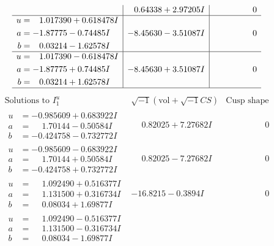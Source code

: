 \documentclass[1p]{elsarticle_modified}
\theoremstyle{definition}
\newcommand{\I}{\sqrt{-1}}
\begin{document}
$$\begin{array}{c|c|c}
 & \phantom{-}0.64338 + 2.97205 I & \phantom{-0.000000 } 0 \\ \hline\begin{aligned}
u &= \phantom{-}1.017390 + 0.618478 I \\
a &= -1.87775 - 0.74485 I \\
b &= \phantom{-}0.03214 - 1.62578 I\end{aligned}
 & -8.45630 - 3.51087 I & \phantom{-0.000000 } 0 \\ \hline\begin{aligned}
u &= \phantom{-}1.017390 - 0.618478 I \\
a &= -1.87775 + 0.74485 I \\
b &= \phantom{-}0.03214 + 1.62578 I\end{aligned}
 & -8.45630 + 3.51087 I & \phantom{-0.000000 } 0\\
 \hline 
 \end{array}$$\newpage$$\begin{array}{c|c|c}  
\text{Solutions to }I^u_{1}& \I (\text{vol} + \sqrt{-1}CS) & \text{Cusp shape}\\
 \hline 
\begin{aligned}
u &= -0.985609 + 0.683922 I \\
a &= \phantom{-}1.70144 - 0.50584 I \\
b &= -0.424758 - 0.732772 I\end{aligned}
 & \phantom{-}0.82025 + 7.27682 I & \phantom{-0.000000 } 0 \\ \hline\begin{aligned}
u &= -0.985609 - 0.683922 I \\
a &= \phantom{-}1.70144 + 0.50584 I \\
b &= -0.424758 + 0.732772 I\end{aligned}
 & \phantom{-}0.82025 - 7.27682 I & \phantom{-0.000000 } 0 \\ \hline\begin{aligned}
u &= \phantom{-}1.092490 + 0.516377 I \\
a &= \phantom{-}1.131500 + 0.316734 I \\
b &= \phantom{-}0.08034 + 1.69877 I\end{aligned}
 & -16.8215 - 0.3894 I & \phantom{-0.000000 } 0 \\ \hline\begin{aligned}
u &= \phantom{-}1.092490 - 0.516377 I \\
a &= \phantom{-}1.131500 - 0.316734 I \\
b &= \phantom{-}0.08034 - 1.69877 I\end{aligned}

\end{array}$$
\end{document}
